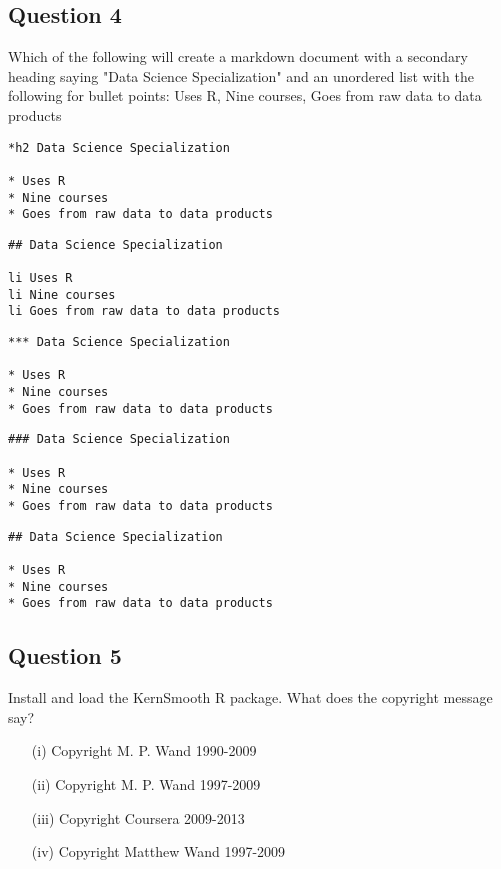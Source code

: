 \documentclass[]{article}
\begin{document}
\subsection*{Question 4}
Which of the following will create a markdown document with a secondary heading saying "Data Science Specialization" and an unordered list with the following for bullet points: Uses R, Nine courses, Goes from raw data to data products
\begin{framed}
\begin{verbatim}
*h2 Data Science Specialization 

* Uses R 
* Nine courses 
* Goes from raw data to data products
\end{verbatim}
\end{framed}

\begin{framed}
\begin{verbatim}
## Data Science Specialization 

li Uses R 
li Nine courses 
li Goes from raw data to data products
\end{verbatim}
\end{framed}

\begin{framed}
\begin{verbatim}
*** Data Science Specialization 

* Uses R 
* Nine courses 
* Goes from raw data to data products
\end{verbatim}
\end{framed}

\begin{framed}
\begin{verbatim}
### Data Science Specialization 

* Uses R 
* Nine courses 
* Goes from raw data to data products
\end{verbatim}
\end{framed}
\newpage
\begin{framed}
\begin{verbatim}
## Data Science Specialization 

* Uses R 
* Nine courses 
* Goes from raw data to data products
\end{verbatim}
\end{framed}
\subsection*{Question 5}
Install and load the KernSmooth R package. What does the copyright message say?
\begin{itemize}
\item[(i)] Copyright M. P. Wand 1990-2009
\item[(ii)] Copyright M. P. Wand 1997-2009
\item[(iii)] Copyright Coursera 2009-2013
\item[(iv)] Copyright Matthew Wand 1997-2009
\end{itemize}

\newpage
\end{document}
